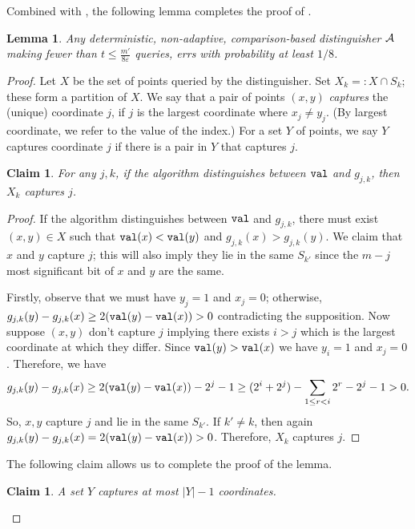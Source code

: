 \documentclass[11pt]{article}
\newtheorem{lemma}[theorem]{Lemma}
\newtheorem{claim}[theorem]{Claim}
\def\eps{\varepsilon}
\newcommand{\cA}{{\cal A}}
\begin{document}
\noindent
Combined with , the following lemma completes the proof of .
\begin{lemma}\label{lem:hard}
Any deterministic, non-adaptive, comparison-based distinguisher $\cA$ making fewer than $t \leq \frac{m'}{8\eps}$ queries, errs with probability at least $1/8$.
\end{lemma}
\begin{proof} 



Let $X$ be the set of points queried by the distinguisher. Set $X_k =: X \cap S_k$; these form a partition of $X$.
We say that a pair of points $(x,y)$ \emph{captures} the (unique) coordinate $j$, if $j$ is the largest
coordinate where $x_j \neq y_j$. (By largest coordinate, we refer to the value of the index.)
For a set $Y$ of points, we say $Y$ captures coordinate $j$ if there is a pair in $Y$ that captures $j$.

\begin{claim}\label{clm:viol}
For any $j,k$, if the algorithm distinguishes between ${\tt val}$ and $g_{j,k}$, then $X_k$ captures $j$.
\end{claim}
\begin{proof} 
If the algorithm distinguishes between ${\tt val}$ and $g_{j,k}$, there must exist $(x,y)\in X$ such that
 ${\tt val}(x) < {\tt val}(y)$ and $g_{j,k}(x) > g_{j,k}(y)$. We claim that $x$ and $y$ capture $j$; this will also imply they lie in the same $S_{k'}$ since the $m-j$ most significant bit of $x$ and $y$ are the same.



Firstly, observe that we must have $y_j = 1$ and $x_j = 0$; otherwise, $g_{j,k}(y) - g_{j,k}(x) \geq 2({\tt val}(y) - {\tt val}(x)) > 0$ contradicting the supposition. Now suppose $(x,y)$ don't capture $j$ implying there exists $i>j$ which is the largest coordinate at which they differ. Since ${\tt val}(y)>{\tt val}(x)$ we have $y_i=1$ and $x_j=0$. Therefore,
we have $$g_{j,k}(y) - g_{j,k}(x) \geq 2({\tt val}(y)-{\tt val}(x)) - 2^{j} - 1
\geq (2^i + 2^j) - \sum_{1 \leq r < i} 2^r - 2^j - 1 > 0.$$
So, $x,y$ capture $j$ and lie in the same $S_{k'}$. If $k'\neq k$, then again $g_{j,k}(y) - g_{j,k}(x) = 2({\tt val}(y)-{\tt val}(x)) > 0$. Therefore, $X_k$ captures $j$.
\end{proof}


\noindent
The following claim allows us to complete the proof of the lemma.
\begin{claim}\label{clm:cap} A set $Y$ captures at most $|Y|-1$ coordinates.
\end{claim}


\end{proof}
\end{document}
